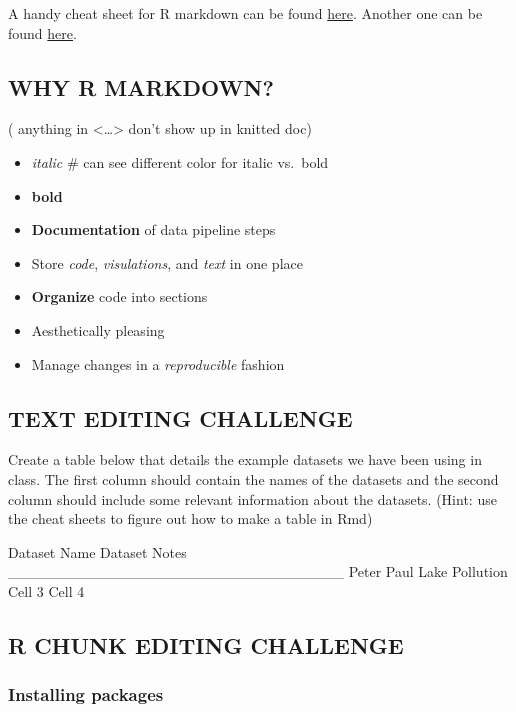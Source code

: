 \documentclass[]{article}
\providecommand{\tightlist}{%
  \setlength{\itemsep}{0pt}\setlength{\parskip}{0pt}}
\begin{document}
A handy cheat sheet for R markdown can be found
\href{https://www.rstudio.com/wp-content/uploads/2015/03/rmarkdown-reference.pdf}{here}.
Another one can be found
\href{https://www.rstudio.com/wp-content/uploads/2015/02/rmarkdown-cheatsheet.pdf}{here}.

\subsection{WHY R MARKDOWN?}\label{why-r-markdown}

 ( anything in \textless{}\ldots{}\textgreater{} don't show up in
knitted doc)

\begin{itemize}
\tightlist
\item
  \emph{italic} \# can see different color for italic vs.~bold
\item
  \textbf{bold}
\item
  \textbf{Documentation} of data pipeline steps
\item
  Store \emph{code}, \emph{visulations}, and \emph{text} in one place
\item
  \textbf{Organize} code into sections
\item
  Aesthetically pleasing
\item
  Manage changes in a \emph{reproducible} fashion
\end{itemize}

\subsection{TEXT EDITING CHALLENGE}\label{text-editing-challenge}

Create a table below that details the example datasets we have been
using in class. The first column should contain the names of the
datasets and the second column should include some relevant information
about the datasets. (Hint: use the cheat sheets to figure out how to
make a table in Rmd)

Dataset Name \textbar{} Dataset Notes
\_\_\_\_\_\_\_\_\_\_\_\_\_\_\_\_\textbar{}\_\_\_\_\_\_\_\_\_\_\_\_\_\_\_\_
\textbar{} Peter Paul Lake \textbar{} Pollution Cell 3 \textbar{} Cell 4

\subsection{R CHUNK EDITING CHALLENGE}\label{r-chunk-editing-challenge}

\subsubsection{Installing packages}\label{installing-packages}
\end{document}
